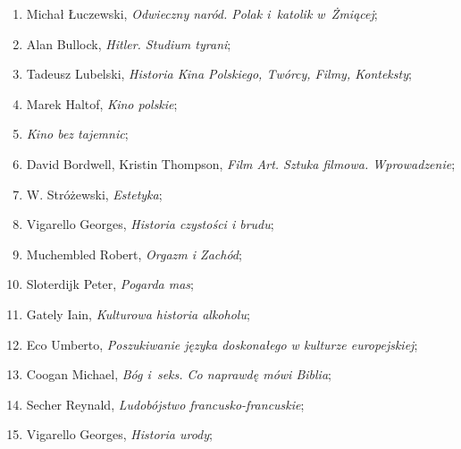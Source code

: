 \documentclass[a4paper,11pt]{article}
\begin{document}
\begin{enumerate}
\item Michał Łuczewski, \textit{Odwieczny naród. Polak i~katolik
    w~Żmiącej};



\item Alan Bullock, \textit{Hitler. Studium tyrani};



\item Tadeusz Lubelski, \textit{Historia Kina Polskiego, Twórcy, Filmy,
    Konteksty};



\item Marek Haltof, \textit{Kino polskie};



\item \textit{Kino bez tajemnic};



\item David Bordwell, Kristin Thompson, \textit{Film Art. Sztuka
    filmowa. Wprowadzenie};



\item W. Stróżewski, \textit{Estetyka};



\item Vigarello Georges, \textit{Historia czystości i brudu};



\item Muchembled Robert, \textit{Orgazm i Zachód};



\item Sloterdijk Peter, \textit{Pogarda mas};



\item Gately Iain, \textit{Kulturowa historia alkoholu};



\item Eco Umberto, \textit{Poszukiwanie języka doskonałego w kulturze
    europejskiej};



\item Coogan Michael, \textit{Bóg i~seks. Co naprawdę mówi Biblia};



\item Secher Reynald, \textit{Ludobójstwo francusko-francuskie};



\item Vigarello Georges, \textit{Historia urody};




\end{enumerate}
\end{document}
